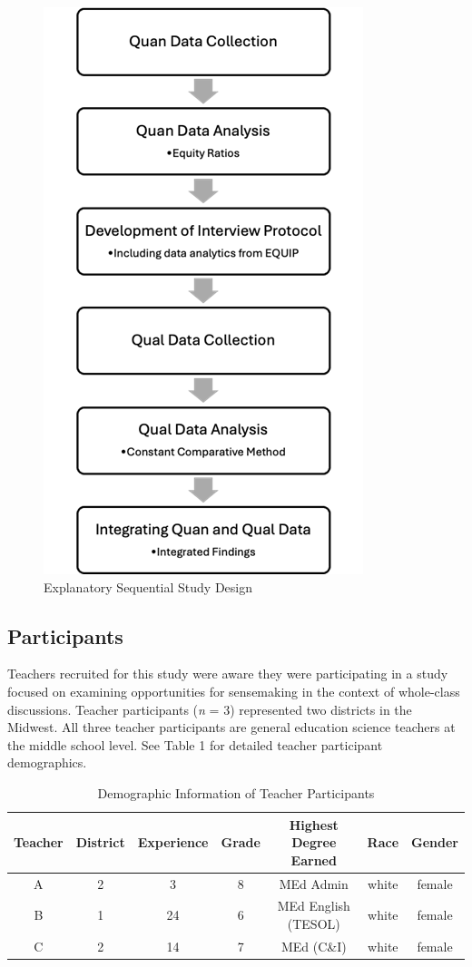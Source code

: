 \documentclass{sig-alternate} %
\begin{document}
\begin{large}
\begin{figure}[htb]
    \centering
    \includegraphics[width=0.75\linewidth]{images/fig1crop.png}
    \caption{Explanatory Sequential Study Design}
\end{figure}

\subsection*{Participants}

Teachers recruited for this study were aware they were participating in a study focused on examining opportunities for sensemaking in the context of whole-class discussions. Teacher participants (\textit{n} = 3) represented two districts in the Midwest. All three teacher participants are general education science teachers at the middle school level. See Table 1 for detailed teacher participant demographics. 

\begin{table}[thb]
\caption{Demographic Information of Teacher Participants}
\begin{tabular}{ccccccc}
\hline
Teacher & District & Experience & Grade & Highest Degree Earned & Race & Gender \\ \hline
A & 2 & 3 & 8 & MEd Admin & white & female \\
B & 1 & 24 & 6 & MEd English (TESOL) & white & female \\
C & 2 & 14 & 7 & MEd (C\&I) & white & female \\ \hline
\end{tabular}
\end{table}


\end{large}
\end{document}
